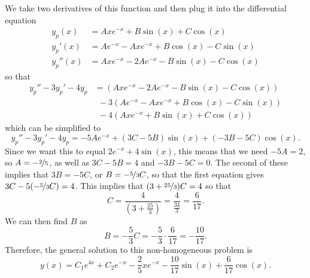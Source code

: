 \documentclass{ximera}
\begin{document}
\begin{exampleSol}
    We take two derivatives of this function and then plug it into the differential equation
    \begin{equation*}
        \begin{split}
            y_p(x) &= Axe^{-x} + B\sin(x) + C\cos(x) \\
            y_p'(x) &= Ae^{-x} - Axe^{-x} + B\cos(x) - C\sin(x) \\
            y_p''(x) &= Axe^{-x} - 2Ae^{-x} - B\sin(x) - C\cos(x)
        \end{split}
    \end{equation*}
    so that 
    \begin{equation*}
        \begin{split}
            y_p'' - 3y_p' - 4y_p &= (Axe^{-x} - 2Ae^{-x} - B\sin(x) - C\cos(x))\\
            &\ \ - 3(Ae^{-x} - Axe^{-x} + B\cos(x) - C\sin(x))\\
            & \ \  - 4(Axe^{-x} + B\sin(x) + C\cos(x))
        \end{split}
    \end{equation*}
    which can be simplified to
    \begin{equation*}
        y_p'' - 3y_p' - 4y_p = -5Ae^{-x} + (3C - 5B)\sin(x) + (-3B-5C)\cos(x).
    \end{equation*}
    Since we want this to equal $2e^{-x} + 4\sin(x)$, this means that we need $-5A = 2$, so $A = -\nicefrac{2}{5}$, as well as $3C - 5B = 4$ and $-3B-5C = 0$. The second of these implies that $3B = -5C$, or $B = -\nicefrac{5}{3}C$, so that the first equation gives $3C - 5(-\nicefrac{5}{3}C) = 4$. This implies that $(3 + \nicefrac{25}{3})C = 4$ so that \[ C = \frac{4}{(3 + \frac{25}{3})} = \frac{4}{\frac{34}{3}} = \frac{6}{17}.\] We can then find $B$ as
    \[ 
        B = -\frac{5}{3}C = -\frac{5}{3} \cdot \frac{6}{17} = -\frac{10}{17}.
    \] 
    Therefore, the general solution to this non-homogeneous problem is
    \begin{equation*}
        y(x) = C_1e^{4x} + C_2e^{-x} - \frac{2}{5}xe^{-x} - \frac{10}{17}\sin(x) + \frac{6}{17}\cos(x).
    \end{equation*}
    

\end{exampleSol}
\end{document}
